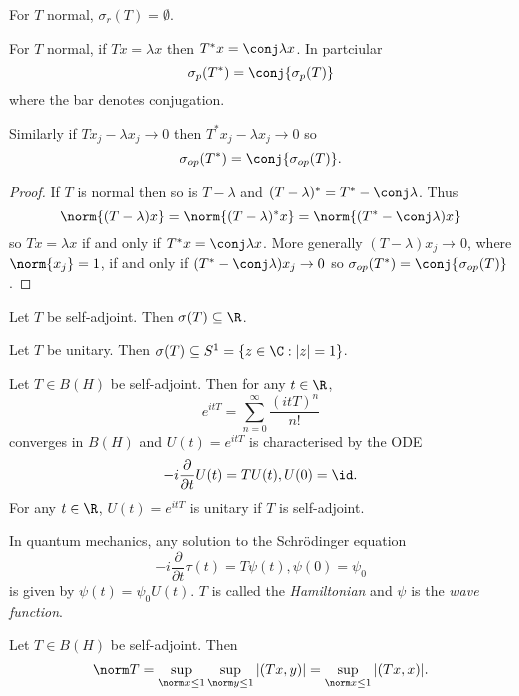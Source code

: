 \documentclass[a4paper]{article}
\begin{document}
\begin{corollary}
  For \(T\) normal, \(\sigma_r(T) = \emptyset\).
\end{corollary}

\begin{corollary}
  For \(T\) normal, if \(Tx = \lambda x\) then \(T^*x = \conj \lambda x\). In partciular
  \[
    \sigma_p(T^*) = \conj{\sigma_p(T)}
  \]
  where the bar denotes conjugation.

  Similarly if \(Tx_j - \lambda x_j \to 0\) then \(T^* x_j - \lambda x_j \to 0\) so
  \[
    \sigma_{op}(T^*) = \conj{\sigma_{op}(T)}.
  \]
\end{corollary}

\begin{proof}
  If \(T\) is normal then so is \(T - \lambda\) and \((T - \lambda)^* = T^* - \conj \lambda\). Thus
  \[
    \norm{(T - \lambda) x} = \norm{(T - \lambda)^* x} = \norm{(T^* - \conj \lambda) x}
  \]
  so \(Tx = \lambda x\) if and only if \(T^*x = \conj \lambda x\). More generally \((T - \lambda)x_j \to 0\), where \(\norm{x_j} = 1\), if and only if \((T^* - \conj \lambda) x_j \to 0\) so \(\sigma_{op}(T^*) = \conj{\sigma_{op}(T)}\).
\end{proof}

\begin{corollary}
  Let \(T\) be self-adjoint. Then \(\sigma(T) \subseteq \R\).
\end{corollary}

\begin{ex}
  Let \(T\) be unitary. Then \(\sigma(T) \subseteq S^1 = \{z \in \C: |z| = 1\}\).
\end{ex}

\begin{eg}
  Let \(T \in B(H)\) be self-adjoint. Then for any \(t \in \R\),
  \[
    e^{it T} = \sum_{n = 0}^\infty \frac{(itT)^n}{n!}
  \]
  converges in \(B(H)\) and \(U(t) = e^{itT}\) is characterised by the ODE
  \[
    -i \frac{\partial  }{\partial t} U(t) = T U(t), U(0) = \id.
  \]
  For any \(t \in \R\), \(U(t) = e^{it T}\) is unitary if \(T\) is self-adjoint.

  In quantum mechanics, any solution to the Schrödinger equation
  \[
    -i \frac{\partial  }{\partial t} \tau(t) = T \psi(t), \psi(0) = \psi_0
  \]
  is given by \(\psi(t) = \psi_0 U(t)\). \(T\) is called the \emph{Hamiltonian} and \(\psi\) is the \emph{wave function}.
\end{eg}

\begin{lemma}
  Let \(T \in B(H)\) be self-adjoint. Then
  \[
    \norm T = \sup_{\norm x \leq 1} \sup_{\norm y \leq 1} |(Tx, y)| = \sup_{\norm x \leq 1} |(Tx, x)|.
  \]
\end{lemma}
\end{document}

